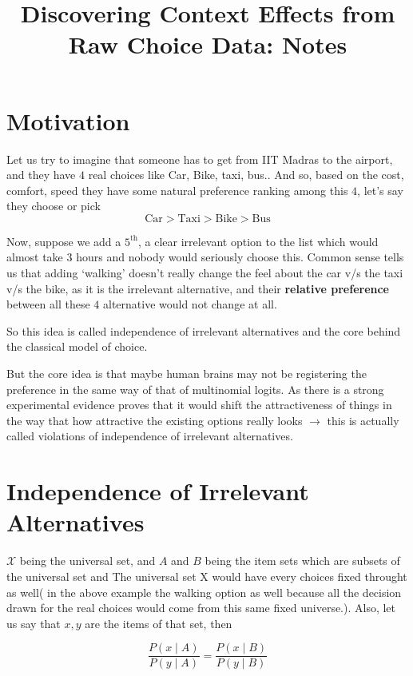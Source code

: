 \documentclass{article}
\title{Discovering Context Effects from Raw Choice Data: Notes}
\author{}
\date{}
\begin{document}
\maketitle
\section{Motivation}
 Let us try to imagine that someone has to get from IIT Madras to
the airport, and they have $4$ real choices like Car, Bike, taxi, bus..
And so, based on the cost, comfort, speed they have some natural
preference ranking among this $4$, let's say they choose or pick
\begin{equation*}
    \text{Car} > \text{Taxi} > \text{Bike} > \text{Bus}
\end{equation*}

Now, suppose we add a $5^{\text{th}}$, a clear irrelevant option to the
list which would almost take $3$ hours and nobody would seriously
choose this. Common sense tells us that adding `walking' doesn't
really change the feel about the car v/s the taxi v/s the bike, as it
is the irrelevant alternative, and their \textbf{relative preference} between all these $4$ alternative would not change at all.

So this idea is called independence of irrelevant alternatives and the
core behind the classical model of choice.

But the core idea is that maybe human brains may not be registering
the preference in the same way of that of multinomial logits. As
there is a strong experimental evidence proves that it would shift the attractiveness of things in the way that how attractive the existing options really looks $\rightarrow$ this is actually called violations of independence of irrelevant alternatives.\cite{seshadri2019}

\section{Independence of Irrelevant Alternatives}

$\mathcal{X}$ being the universal set, and $A$ and $B$ being the item
sets which are subsets of the universal set and The universal set X would have every choices fixed throught as well( in the above example the walking option as well because all the decision drawn for the real choices would come from this same fixed universe.). Also, let us say that $x, y$ are the
items of that set, then

\begin{equation}
    \frac{P(x \mid A)}{P(y \mid A)} = \frac{P(x \mid B)}{P(y \mid B)}
\end{equation}
\end{document}
